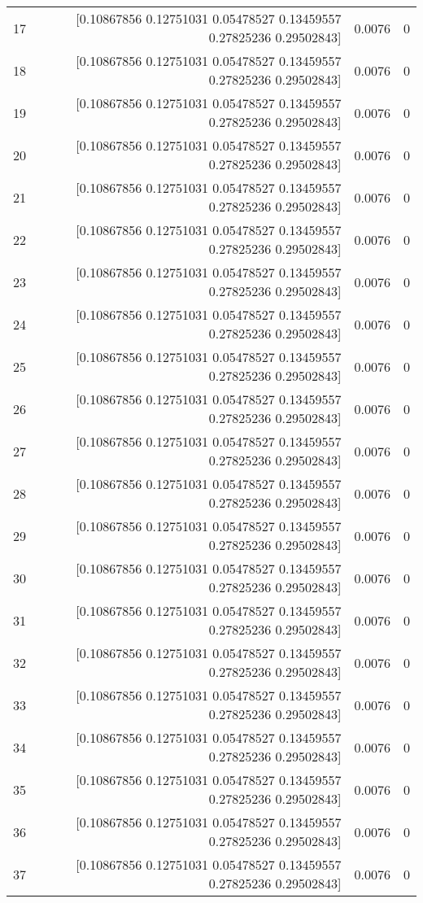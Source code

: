 \begin{longtable}{lrrr}
17 & [0.10867856 0.12751031 0.05478527 0.13459557 0.27825236 0.29502843] & 0.0076 & 0 \\
18 & [0.10867856 0.12751031 0.05478527 0.13459557 0.27825236 0.29502843] & 0.0076 & 0 \\
19 & [0.10867856 0.12751031 0.05478527 0.13459557 0.27825236 0.29502843] & 0.0076 & 0 \\
20 & [0.10867856 0.12751031 0.05478527 0.13459557 0.27825236 0.29502843] & 0.0076 & 0 \\
21 & [0.10867856 0.12751031 0.05478527 0.13459557 0.27825236 0.29502843] & 0.0076 & 0 \\
22 & [0.10867856 0.12751031 0.05478527 0.13459557 0.27825236 0.29502843] & 0.0076 & 0 \\
23 & [0.10867856 0.12751031 0.05478527 0.13459557 0.27825236 0.29502843] & 0.0076 & 0 \\
24 & [0.10867856 0.12751031 0.05478527 0.13459557 0.27825236 0.29502843] & 0.0076 & 0 \\
25 & [0.10867856 0.12751031 0.05478527 0.13459557 0.27825236 0.29502843] & 0.0076 & 0 \\
26 & [0.10867856 0.12751031 0.05478527 0.13459557 0.27825236 0.29502843] & 0.0076 & 0 \\
27 & [0.10867856 0.12751031 0.05478527 0.13459557 0.27825236 0.29502843] & 0.0076 & 0 \\
28 & [0.10867856 0.12751031 0.05478527 0.13459557 0.27825236 0.29502843] & 0.0076 & 0 \\
29 & [0.10867856 0.12751031 0.05478527 0.13459557 0.27825236 0.29502843] & 0.0076 & 0 \\
30 & [0.10867856 0.12751031 0.05478527 0.13459557 0.27825236 0.29502843] & 0.0076 & 0 \\
31 & [0.10867856 0.12751031 0.05478527 0.13459557 0.27825236 0.29502843] & 0.0076 & 0 \\
32 & [0.10867856 0.12751031 0.05478527 0.13459557 0.27825236 0.29502843] & 0.0076 & 0 \\
33 & [0.10867856 0.12751031 0.05478527 0.13459557 0.27825236 0.29502843] & 0.0076 & 0 \\
34 & [0.10867856 0.12751031 0.05478527 0.13459557 0.27825236 0.29502843] & 0.0076 & 0 \\
35 & [0.10867856 0.12751031 0.05478527 0.13459557 0.27825236 0.29502843] & 0.0076 & 0 \\
36 & [0.10867856 0.12751031 0.05478527 0.13459557 0.27825236 0.29502843] & 0.0076 & 0 \\
37 & [0.10867856 0.12751031 0.05478527 0.13459557 0.27825236 0.29502843] & 0.0076 & 0 \\

\end{longtable}
